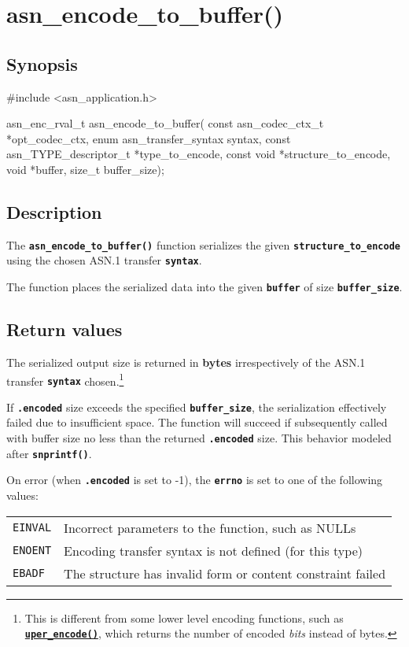 \documentclass[english,oneside,12pt]{book}
\newcommand{\apisection}[2]{\clearpage\section{\label{#1}#2}}
\newcommand{\api}[2]{\hyperref[#1]{\code{#2}}}
\newcommand{\code}[1]{\texttt{\textbf{\lstinline{#1}}}}
\begin{document}
\apisection{sec:asn_encode_to_buffer}{asn\_encode\_to\_buffer()}

\subsection*{Synopsis}

\begin{signature}
#include <asn_application.h>

asn_enc_rval_t asn_encode_to_buffer(
    const asn_codec_ctx_t *opt_codec_ctx,
    enum asn_transfer_syntax syntax,
    const asn_TYPE_descriptor_t *type_to_encode,
    const void *structure_to_encode,
    void *buffer, size_t buffer_size);
\end{signature}

\subsection*{Description}

The \code{asn_encode_to_buffer()} function serializes the given \code{structure_to_encode} using the chosen ASN.1 transfer \code{syntax}.

The function places the serialized data into the given
\code{buffer} of size \code{buffer_size}.

\subsection*{Return values}


The serialized output size is returned in \textbf{bytes} irrespectively of the
ASN.1 transfer \code{syntax} chosen.\footnote{This is different from some
lower level encoding functions, such as \api{sec:uper_encode}{uper_encode()},
which returns the number of encoded \emph{bits} instead of bytes.}

If \code{.encoded} size exceeds the specified \code{buffer_size},
the serialization effectively failed due to insufficient space. The function
will succeed if subsequently called with buffer size no less than the returned
\code{.encoded} size. This behavior modeled after \code{snprintf()}.

On error (when \code{.encoded} is set to -1),
the \code{errno} is set to one of the following values:

\begin{tabular}[h!]{ll}
\texttt{EINVAL} & Incorrect parameters to the function, such as NULLs \\
\texttt{ENOENT} & Encoding transfer syntax is not defined (for this type) \\
\texttt{EBADF} & The structure has invalid form or content constraint failed
\end{tabular}
\end{document}
